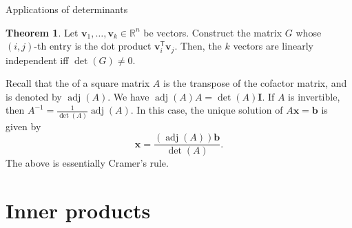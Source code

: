 \documentclass[dvipsnames]{beamer}
\newcommand{\TT}{\mathsf{T}}
\DeclareMathOperator{\adj}{adj}
\theoremstyle{definition}
\newtheorem{thm}{Theorem}
\begin{document}
\begin{frame}{Applications of determinants}
    \begin{thm}
        Let $\mathbf{v}_{1}, \ldots, \mathbf{v}_{k} \in \mathbb{R}^{n}$ be vectors. \pause Construct the matrix $G$ whose $(i, j)$-th entry is the dot product $\mathbf{v}_{i}^{\TT} \mathbf{v}_{j}$. \pause Then, the $k$ vectors are linearly independent iff $\det(G) \neq 0$.
    \end{thm} \pause

    Recall that the  of a square matrix $A$ is the transpose of the cofactor matrix, and is denoted by $\adj(A)$. \pause We have $\adj(A) A = \det(A) \mathbf{I}$. \pause If $A$ is invertible, then $A^{-1} = \frac{1}{\det(A)} \adj(A)$. \pause In this case, the unique solution of $A \mathbf{x} = \mathbf{b}$ is given by
    \begin{equation*} 
        \mathbf{x} = \frac{(\adj(A)) \mathbf{b}}{\det(A)}.
    \end{equation*}
    The above is essentially Cramer's rule.
\end{frame}

\section{Inner products}
\end{document}
